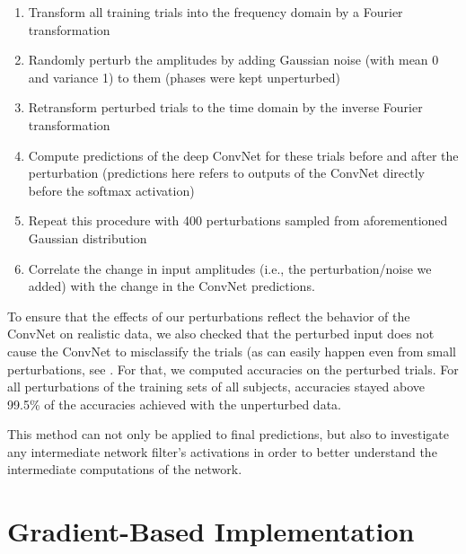 \begin{enumerate}
\item
Transform all training trials into the frequency domain by a Fourier
transformation 
\item
Randomly perturb the amplitudes by adding Gaussian
noise (with mean 0 and variance 1) to them (phases were kept
unperturbed) 
\item
Retransform perturbed trials to the time domain by the
inverse Fourier transformation
\item
Compute predictions of the deep
ConvNet for these trials before and after the perturbation (predictions
here refers to outputs of the ConvNet directly before the softmax
activation)
\item
Repeat this procedure with 400 perturbations sampled from
aforementioned Gaussian distribution
\item
Correlate the change in input
amplitudes (i.e., the perturbation/noise we added) with the change in
the ConvNet predictions.
\end{enumerate}


To ensure that the effects of our perturbations reflect the behavior of
the ConvNet on realistic data, we also checked that the perturbed input
does not cause the ConvNet to misclassify the trials (as can easily
happen even from small perturbations, see
\citep{szegedy_intriguing_2014}. For that, we computed
accuracies on the perturbed trials. For all perturbations of the
training sets of all subjects, accuracies stayed above 99.5\% of the
accuracies achieved with the unperturbed data.

This method can not only be applied to final predictions, but also to
investigate any intermediate network filter's activations in order to
better understand the intermediate computations of the network.


\section{Gradient-Based
Implementation}\label{gradient-based-implementation}

